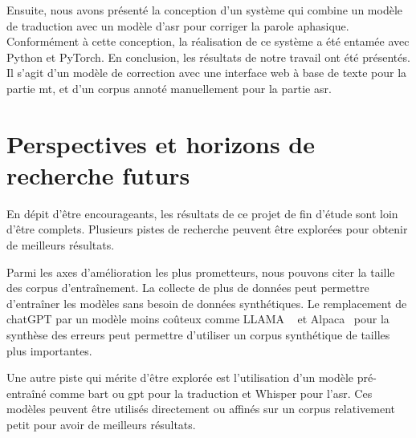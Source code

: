 Ensuite, nous avons présenté la conception d'un système 
qui combine un modèle de traduction avec un modèle d'\gls{asr} pour corriger la parole aphasique.
Conformément à cette conception, la réalisation de ce système a été entamée avec Python et PyTorch.
En conclusion, les résultats de notre travail ont été présentés.
Il s'agit d'un modèle de correction avec une interface web à base de texte pour la partie \gls{mt},
et d'un corpus annoté manuellement pour la partie \gls{asr}.

\section*{Perspectives et horizons de recherche futurs}

En dépit d'être encourageants, les résultats de ce projet de fin d'étude sont loin d'être complets.
Plusieurs pistes de recherche peuvent être explorées pour obtenir de meilleurs résultats.

Parmi les axes d'amélioration les plus prometteurs, nous pouvons citer la taille des corpus d'entraînement.
La collecte de plus de données peut permettre d'entraîner les modèles sans besoin de données synthétiques.
Le remplacement de chatGPT par un modèle moins coûteux comme LLAMA%
~\cite{Touvron_Lavril_Izacard_Martinet_Lachaux_Lacroix_Rozière_Goyal_Hambro_Azhar_etal._2023}
et Alpaca~\cite{Zhang_Han_Zhou_Hu_Yan_Lu_Li_Gao_Qiao_2023}
pour la synthèse des erreurs peut permettre d'utiliser un corpus synthétique de tailles plus importantes.

Une autre piste qui mérite d'être explorée est l'utilisation d'un modèle pré-entraîné comme \gls{bart} ou \gls{gpt}
pour la traduction et Whisper pour l'\gls{asr}.
Ces modèles peuvent être utilisés directement 
ou affinés sur un corpus relativement petit pour avoir de meilleurs résultats. 
